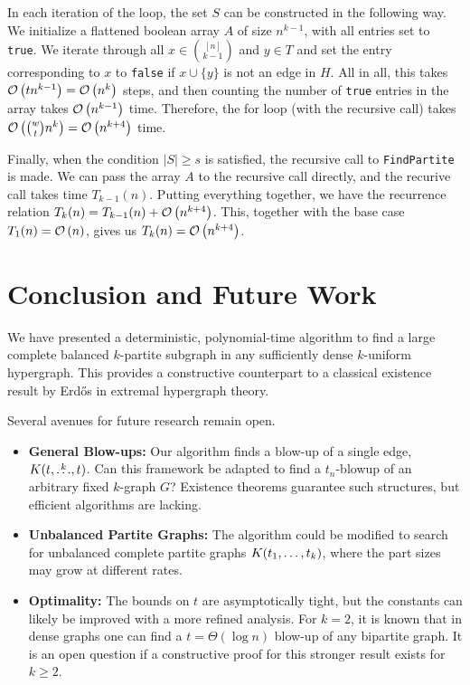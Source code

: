 In each iteration of the loop, the set $S$ can be constructed in the following way.
We initialize a flattened boolean array $A$ of size $n^{k-1}$,
with all entries set to \texttt{true}.
We iterate through all $x \in \binom{[n]}{k-1}$ and $y \in T$
and set the entry corresponding to $x$ to \texttt{false} if $x \cup \{y\}$ is not an edge in $H$.
All in all, this takes $\mathcal{O}\left(tn^{k-1}\right) = \mathcal{O}\left(n^k\right)$ steps, and then counting the number of \texttt{true} entries in the array takes $\mathcal{O}\left(n^{k-1}\right)$ time.
Therefore, the for loop (with the recursive call) takes $\mathcal{O}\left(\binom{w}{t} n^{k}\right) = \mathcal{O}\left(n^{k+4}\right)$ time.

Finally, when the condition $|S| \geq s$ is satisfied, the recursive call to \texttt{FindPartite} is made.
We can pass the array $A$ to the recursive call directly, and the recurive call takes time $T_{k-1}(n)$.
Putting everything together, we have the recurrence relation $T_k(n) = T_{k-1}(n) + \mathcal{O}\left(n^{k+4}\right)$.
This, together with the base case $T_1(n) = \mathcal{O}\left(n\right)$, gives us $T_k(n) = \mathcal{O}\left(n^{k+4}\right)$.






\section{Conclusion and Future Work}\label{sec:conclusion-and-future-work}

We have presented a deterministic,
polynomial-time algorithm to find a large complete balanced $k$-partite subgraph in any sufficiently dense $k$-uniform hypergraph.
This provides a constructive counterpart to a classical existence result by Erd\H{o}s in extremal hypergraph theory.

Several avenues for future research remain open.
\begin{itemize}
    \item \textbf{General Blow-ups:} Our algorithm finds a blow-up of a single edge, $K(t, \overset{k}{\dots}, t)$.
    Can this framework be adapted to find a $t_n$-blowup of an arbitrary fixed $k$-graph $G$? Existence theorems guarantee such structures, but efficient algorithms are lacking.
    \item \textbf{Unbalanced Partite Graphs:} The algorithm could be modified to search for unbalanced complete partite graphs $K(t_1, \dots, t_k)$, where the part sizes may grow at different rates.
    \item \textbf{Optimality:} The bounds on $t$ are asymptotically tight, but the constants can likely be improved with a more refined analysis.
    For $k=2$, it is known that in dense graphs one can find a $t=\Theta(\log n)$ blow-up of any bipartite graph.
    It is an open question if a constructive proof for this stronger result exists for $k \ge 2$.
\end{itemize}

